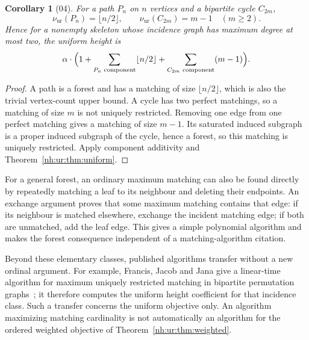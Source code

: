 \documentclass[11pt,a4paper]{article}
\newtheorem{corollary}[theorem]{Corollary}
\theoremstyle{definition}
\theoremstyle{remark}
\newcommand{\nuur}{\nu_{\mathrm{ur}}}
\begin{document}
\begin{corollary}[04]\label{nh:ur:cor:degree2}
For a path $P_n$ on $n$ vertices and a bipartite cycle $C_{2m}$,
\[
 \nuur(P_n)=\lfloor n/2\rfloor,\qquad
 \nuur(C_{2m})=m-1\quad(m\ge2).
\]
Hence for a nonempty skeleton whose incidence graph has maximum degree at
most two, the uniform height is
\begin{equation}\label{nh:ur:eq:degree2height}
 \alpha\cdot\Bigl(1+
   \sum_{P_n\text{ component}}\lfloor n/2\rfloor+
   \sum_{C_{2m}\text{ component}}(m-1)\Bigr).
\end{equation}
\end{corollary}
\begin{proof}
A path is a forest and has a matching of size $\lfloor n/2\rfloor$, which is
also the trivial vertex-count upper bound. A cycle has two perfect matchings,
so a matching of size $m$ is not uniquely restricted. Removing one edge from
one perfect matching gives a matching of size $m-1$. Its saturated induced
subgraph is a proper induced subgraph of the cycle, hence a forest, so this
matching is uniquely restricted. Apply component additivity and
Theorem~\ref{nh:ur:thm:uniform}.
\end{proof}

For a general forest, an ordinary maximum matching can also be found directly
by repeatedly matching a leaf to its neighbour and deleting their endpoints.
An exchange argument proves that some maximum matching contains that edge: if
its neighbour is matched elsewhere, exchange the incident matching edge; if
both are unmatched, add the leaf edge. This gives a simple polynomial
algorithm and makes the forest consequence independent of a
matching-algorithm citation.

Beyond these elementary classes, published algorithms transfer without a new
ordinal argument. For example, Francis, Jacob and Jana give a linear-time
algorithm for maximum uniquely restricted matching in bipartite permutation
graphs~\cite{FJJ2018}; it therefore computes the uniform height coefficient
for that incidence class. Such a transfer concerns the uniform objective only.
An algorithm maximizing matching cardinality is not automatically an
algorithm for the ordered weighted objective of
Theorem~\ref{nh:ur:thm:weighted}.
\end{document}
